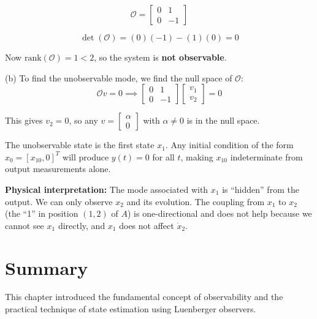 \begin{equation}
\mathcal{O} = \begin{bmatrix} 0 & 1 \\ 0 & -1 \end{bmatrix}
\end{equation}

\begin{equation}
\det(\mathcal{O}) = (0)(-1) - (1)(0) = 0
\end{equation}

Now $\text{rank}(\mathcal{O}) = 1 < 2$, so the system is \textbf{not observable}.

(b) To find the unobservable mode, we find the null space of $\mathcal{O}$:
\begin{equation}
\mathcal{O} v = 0 \implies \begin{bmatrix} 0 & 1 \\ 0 & -1 \end{bmatrix} \begin{bmatrix} v_1 \\ v_2 \end{bmatrix} = 0
\end{equation}

This gives $v_2 = 0$, so any $v = \begin{bmatrix} \alpha \\ 0 \end{bmatrix}$ with $\alpha \neq 0$ is in the null space.

The unobservable state is the first state $x_1$. Any initial condition of the form $x_0 = [x_{10}, 0]^T$ will produce $y(t) = 0$ for all $t$, making $x_{10}$ indeterminate from output measurements alone.

\textbf{Physical interpretation:} The mode associated with $x_1$ is ``hidden'' from the output. We can only observe $x_2$ and its evolution. The coupling from $x_1$ to $x_2$ (the ``1'' in position $(1,2)$ of $A$) is one-directional and does not help because we cannot see $x_1$ directly, and $x_1$ does not affect $\dot{x}_2$.

\section{Summary}

This chapter introduced the fundamental concept of observability and the practical technique of state estimation using Luenberger observers.


